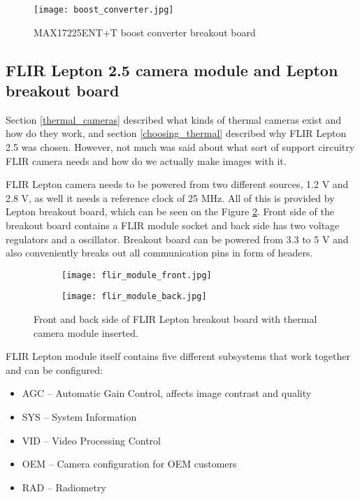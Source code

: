 \begin{figure}[ht]
        \centering
        \texttt{[image: boost\_converter.jpg]} 
        \caption{ MAX17225ENT+T boost converter breakout board}
        \label{boost_converter}
\end{figure}

\subsection{ FLIR Lepton 2.5 camera module and Lepton breakout board}

Section \ref{thermal_cameras} described what kinds of thermal cameras exist and how do they work, and section \ref{choosing_thermal} described why FLIR Lepton 2.5 was chosen.
However, not much was said about what sort of support circuitry FLIR camera needs and how do we actually make images with it.

FLIR Lepton camera needs to be powered from two different sources, 1.2 \si{\volt} and 2.8 \si{\volt}, as well it needs a reference clock of 25 \si{\mega\hertz}.
All of this is provided by Lepton breakout board, which can be seen on the Figure \ref{lepton_breakout}.
Front side of the breakout board contains a FLIR module socket and back side has two voltage regulators and a oscillator.
Breakout board can be powered from 3.3 to 5 \si{\volt} and also conveniently breaks out all communication pins in form of headers.

\begin{figure}[ht] 
    \begin{subfigure}[b]{0.5\textwidth}
        \centering
        \texttt{[image: flir\_module\_front.jpg]} 
    \end{subfigure}
    \begin{subfigure}[b]{0.5\textwidth}
        \centering
        \texttt{[image: flir\_module\_back.jpg]} 
    \end{subfigure}
    \caption{ Front and back side of FLIR Lepton breakout board with thermal camera module inserted.}
    \label{lepton_breakout}
\end{figure}

FLIR Lepton module itself contains five different subsystems that work together and can be configured:

\begin{itemize}
    \item AGC – Automatic Gain Control, affects image contrast and quality
    \item SYS – System Information
    \item VID – Video Processing Control
    \item OEM – Camera configuration for OEM customers
    \item RAD – Radiometry
\end{itemize}

